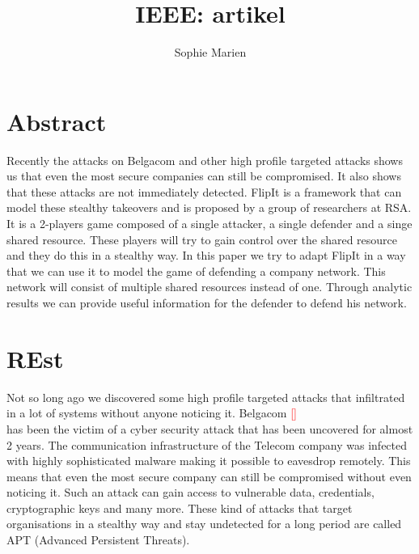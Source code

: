 \documentclass[a4paper, 11pt]{article}
\newcommand{\comment}[1]{\textcolor{red}{#1}\\}
\begin{document}
\begin{titlepage}
\title{IEEE: artikel}
\author{Sophie Marien}
\date{} 
\end{titlepage}



\maketitle
\section*{Abstract}
Recently the attacks on Belgacom and other high profile targeted attacks shows us that even the most secure companies can still be compromised. It also shows that these attacks are not immediately detected. FlipIt is a framework that can model these stealthy takeovers and is proposed by a group of researchers at RSA. It is a 2-players game composed of a single attacker, a single defender and a singe shared resource. These players will try to gain control over the shared resource and they do this in a stealthy way. In this paper we try to adapt FlipIt in a way that we can use it to model the game of defending a company network. This network will consist of multiple shared resources instead of one. Through analytic results we can provide useful information for the defender to defend his network.


\section{REst}
 
 Not so long ago we discovered some high profile targeted attacks that infiltrated in a lot of systems without anyone noticing it. Belgacom \comment{[]} has been the victim of a cyber security attack that has been uncovered for almost 2 years. The communication infrastructure of the Telecom company was infected with highly sophisticated malware making it possible to eavesdrop remotely. This means that even the most secure company can still be compromised without even noticing it. Such an attack can gain access to vulnerable data, credentials, cryptographic keys and many more. These kind of attacks that target organisations in a stealthy way and stay undetected for a long period are called APT (Advanced Persistent Threats). 
 
\end{document}
